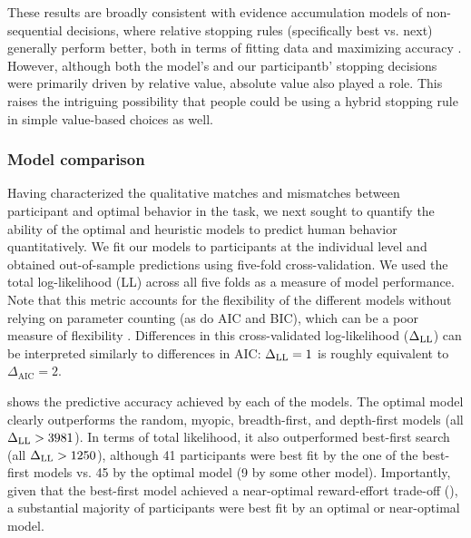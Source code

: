 These results are broadly consistent with evidence accumulation models of non-sequential decisions, where relative stopping rules (specifically best vs. next) generally perform better, both in terms of fitting data \citep{ratcliff2004comparison,teodorescu2013disentangling} and maximizing accuracy \citep{mcmillen2006dynamics,bogacz2006physics}. However, although both the model's and our participantb' stopping decisions were primarily driven by relative value, absolute value also played a role. This raises the intriguing possibility that people could be using a hybrid stopping rule in simple value-based choices as well.

\subsubsection{Model comparison}\label{sec:planning-comparison}
Having characterized the qualitative matches and mismatches between participant and optimal behavior in the task, we next sought to quantify the ability of the optimal and heuristic models to predict human behavior quantitatively.
%
We fit our models to participants at the individual level and obtained out-of-sample predictions using five-fold cross-validation. We used the total log-likelihood (LL) across all five folds as a measure of model performance. Note that this metric accounts for the flexibility of the different models without relying on parameter counting (as do AIC and BIC), which can be a poor measure of flexibility \citep{piantadosi2018one}. Differences in this cross-validated log-likelihood ($\Delta_{\mathrm{LL}}$) can be interpreted similarly to differences in AIC: $\Delta_{\mathrm{LL}} = 1$ is roughly equivalent to $\Delta_{\mathrm{AIC}} = 2$.

 shows the predictive accuracy achieved by each of the models. The optimal model clearly outperforms the random, myopic, breadth-first, and depth-first models (all $\Delta_{\mathrm{LL}} > 3981$). In terms of total likelihood, it also outperformed best-first search (all $\Delta_{\mathrm{LL}} > 1250$), although 41 participants were best fit by the one of the best-first models vs. 45 by the optimal model (9 by some other model). Importantly, given that the best-first model achieved a near-optimal reward-effort trade-off (), a substantial majority of participants were best fit by an optimal or near-optimal model.
%



